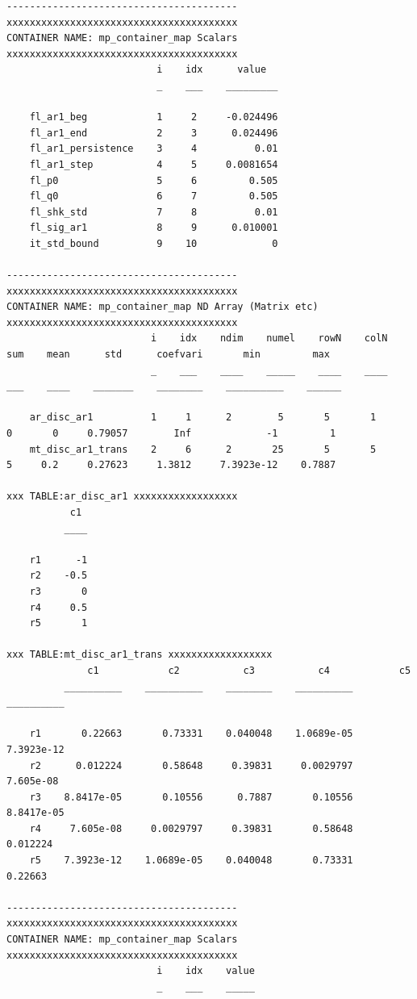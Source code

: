 \documentclass[
]{book}
\begin{document}
\begin{verbatim}
----------------------------------------
xxxxxxxxxxxxxxxxxxxxxxxxxxxxxxxxxxxxxxxx
CONTAINER NAME: mp_container_map Scalars
xxxxxxxxxxxxxxxxxxxxxxxxxxxxxxxxxxxxxxxx
                          i    idx      value  
                          _    ___    _________

    fl_ar1_beg            1     2     -0.024496
    fl_ar1_end            2     3      0.024496
    fl_ar1_persistence    3     4          0.01
    fl_ar1_step           4     5     0.0081654
    fl_p0                 5     6         0.505
    fl_q0                 6     7         0.505
    fl_shk_std            7     8          0.01
    fl_sig_ar1            8     9      0.010001
    it_std_bound          9    10             0

----------------------------------------
xxxxxxxxxxxxxxxxxxxxxxxxxxxxxxxxxxxxxxxx
CONTAINER NAME: mp_container_map ND Array (Matrix etc)
xxxxxxxxxxxxxxxxxxxxxxxxxxxxxxxxxxxxxxxx
                         i    idx    ndim    numel    rowN    colN    sum    mean      std      coefvari       min         max  
                         _    ___    ____    _____    ____    ____    ___    ____    _______    ________    __________    ______

    ar_disc_ar1          1     1      2        5       5       1       0       0     0.79057        Inf             -1         1
    mt_disc_ar1_trans    2     6      2       25       5       5       5     0.2     0.27623     1.3812     7.3923e-12    0.7887

xxx TABLE:ar_disc_ar1 xxxxxxxxxxxxxxxxxx
           c1 
          ____

    r1      -1
    r2    -0.5
    r3       0
    r4     0.5
    r5       1

xxx TABLE:mt_disc_ar1_trans xxxxxxxxxxxxxxxxxx
              c1            c2           c3           c4            c5    
          __________    __________    ________    __________    __________

    r1       0.22663       0.73331    0.040048    1.0689e-05    7.3923e-12
    r2      0.012224       0.58648     0.39831     0.0029797     7.605e-08
    r3    8.8417e-05       0.10556      0.7887       0.10556    8.8417e-05
    r4     7.605e-08     0.0029797     0.39831       0.58648      0.012224
    r5    7.3923e-12    1.0689e-05    0.040048       0.73331       0.22663

----------------------------------------
xxxxxxxxxxxxxxxxxxxxxxxxxxxxxxxxxxxxxxxx
CONTAINER NAME: mp_container_map Scalars
xxxxxxxxxxxxxxxxxxxxxxxxxxxxxxxxxxxxxxxx
                          i    idx    value
                          _    ___    _____


\end{verbatim}
\end{document}

